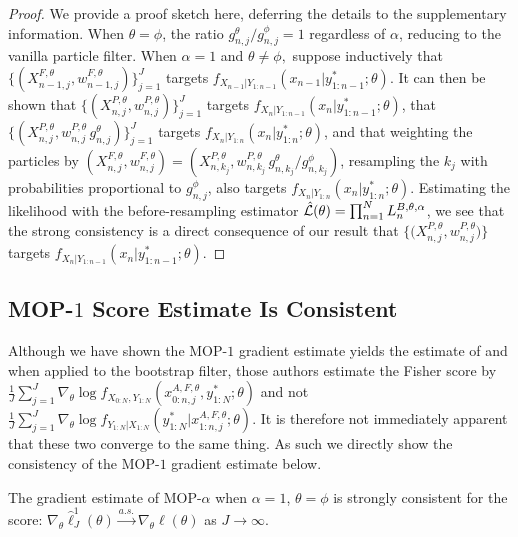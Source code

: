 \documentclass[numsec,webpdf,modern,medium,namedate]{oup-authoring-template}
\newcommand\arxiv[2]{#2} %
\theoremstyle{thmstyleone}%
\theoremstyle{thmstyletwo}%
\theoremstyle{thmstylethree}%
\begin{document}
\begin{proof}
    We provide a proof sketch here, deferring the details to \arxiv{Appendix~\ref{appendix:targeting}}{the supplementary information}. 
    When $\theta=\phi$, the ratio ${g_{n,j}^\theta}/{g_{n,j}^\phi}=1$ regardless of $\alpha$, reducing to the vanilla particle filter.
    When $\alpha=1$ and $\theta\neq\phi,$ suppose inductively that $\{(X^{F,\theta}_{n-1,j},w^{F,\theta}_{n-1,j})\}_{j=1}^J$ targets $f_{X_{n-1}|Y_{1:n-1}}(x_{n-1}|y^*_{1:n-1};\theta)$.
    It can then be shown that $\{(X^{P,\theta}_{n,j},w^{P,\theta}_{n,j})\}_{j=1}^J$ targets $f_{X_{n}|Y_{1:n-1}}(x_{n}|y^*_{1:n-1};\theta)$, that $\{(X^{P,\theta}_{n,j},w^{P,\theta}_{n,j} \, g^\theta_{n,j} )\}_{j=1}^J$ targets  $f_{X_{n}|Y_{1:n}}(x_{n}|y^*_{1:n};\theta)$, and that weighting the particles by $(X^{F,\theta}_{n,j},w^{F,\theta}_{n,j}) = (X^{P,\theta}_{n,k_j}, w^{P,\theta}_{n,k_j} \, g^\theta_{n,k_j} \big/ g^\phi_{n,k_j})$,
    resampling the $k_j$ with probabilities proportional to $g^\phi_{n,j}$, also targets $f_{X_{n}|Y_{1:n}}(x_{n}|y^*_{1:n};\theta)$.
    Estimating the likelihood with the before-resampling estimator $\hat{\mathcal{L}}(\theta) = \prod_{n=1}^N L_n^{B,\theta,\alpha}$, we see that the strong consistency is a direct consequence of our result that $\{ \big(X^{P,\theta}_{n,j},w^{P,\theta}_{n,j}\big) \}$ targets $f_{X_{n}|Y_{1:n-1}}(x_{n}|y^*_{1:n-1};\theta)$. 
\end{proof}


\subsection{MOP-$1$ Score Estimate Is Consistent}

Although we have shown the MOP-$1$ gradient estimate yields the estimate of \cite{poyiadjis11} and \cite{scibior21} when applied to the bootstrap filter, those authors estimate the Fisher score by 
$\frac{1}{J}\sum_{j=1}^J \nabla_\theta \log f_{X_{0:N}, Y_{1:N}}(x_{0:n,j}^{A, F,\theta}, y_{1:N}^* ; \theta)$ and not
$\frac{1}{J}\sum_{j=1}^J \nabla_\theta \log f_{Y_{1:N}| X_{1:N}}(y_{1:N}^* | x_{1:n,j}^{A, F,\theta}; \theta).$
It is therefore not immediately apparent that these two converge to the same thing. As such we directly show the consistency of the MOP-$1$ gradient estimate below. 

\begin{thm}
    The gradient estimate of MOP-$\alpha$ when $\alpha=1$, $\theta=\phi$ is strongly consistent for the score: $\nabla_\theta \hat\ell_J^1(\theta) \stackrel{a.s.}{\to} \nabla_\theta \ell(\theta)$ as $J \to \infty$.
    \label{thm:mop-grad-consistency}
\end{thm}
\end{document}
